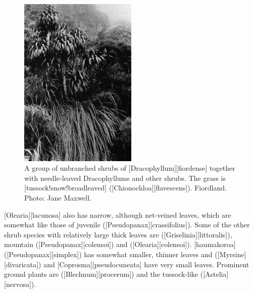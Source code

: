 \begin{figure}
	\includegraphics[width=0.5\textwidth]{graphics/figure92dracophyllum.jpg}
	\centering
	\caption[A group of unbranched shrubs of \emph{Dracophyllum fiordense}]{A group of unbranched shrubs of [Dracophyllum][fiordense] together with needle-leaved Dracophyllums and other shrubs.
	The grass is [tussock!snow!broadleaved] ([Chionochloa][flavescens]).
	Fiordland.
	Photo: Jane Maxwell.}%
	\label{fig:92dracophyllum}
\end{figure}

[Olearia][lacunosa] also has narrow, although net-veined leaves, which are somewhat like those of juvenile  ([Pseudopanax][crassifolius]).
Some of the other shrub species with relatively large thick leaves are  ([Griselinia][littoralis]), mountain  ([Pseudopanax][colensoi]) and  ([Olearia][colensoi]).
[haumakoroa] ([Pseudopanax][simplex]) has somewhat smaller, thinner leaves and  ([Myrsine][divaricata]) and [Coprosma][pseudocuneata] have very small leaves.
Prominent ground plants are  ([Blechnum][procerum]) and the tussock-like  ([Astelia][nervosa]).

